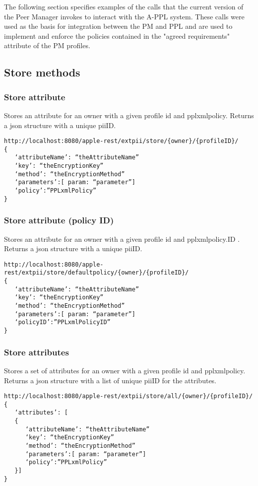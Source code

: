 The following section specifies examples of the calls that the current version of the Peer Manager invokes to interact with the A-PPL system. These calls were used as the basis for integration between the PM and PPL and are used to implement and enforce the policies contained in the "agreed requirements" attribute of the PM profiles.


\subsection{Store methods}
\subsubsection{Store attribute}
Stores an attribute for an owner with a given profile id and pplxmlpolicy. Returns a json structure with a unique piiID.
\begin{verbatim}
http://localhost:8080/apple-rest/extpii/store/{owner}/{profileID}/
{
   ‘attributeName’: “theAttributeName”
   ‘key’: “theEncryptionKey”
   ‘method’: “theEncryptionMethod”
   ‘parameters’:[ param: “parameter”]
   ‘policy’:”PPLxmlPolicy”
}
\end{verbatim}

\subsubsection{Store attribute (policy ID)}
Stores an attribute for an owner with a given profile id and pplxmlpolicy.ID . Returns a json structure with a unique piiID.
\begin{verbatim}
http://localhost:8080/apple-rest/extpii/store/defaultpolicy/{owner}/{profileID}/
{ 
   ‘attributeName’: “theAttributeName”
   ‘key’: “theEncryptionKey”
   ‘method’: “theEncryptionMethod”
   ‘parameters’:[ param: “parameter”]
   ‘policyID’:”PPLxmlPolicyID”
}
\end{verbatim}

\subsubsection{Store attributes}
Stores a set of attributes for an owner with a given profile id and pplxmlpolicy. Returns a json structure with a list of unique piiID  for the attributes.
\begin{verbatim}
http://localhost:8080/apple-rest/extpii/store/all/{owner}/{profileID}/
{
   ‘attributes’: [  
   { 
      ‘attributeName’: “theAttributeName”
      ‘key’: “theEncryptionKey”
      ‘method’: “theEncryptionMethod”
      ‘parameters’:[ param: “parameter”]
      ‘policy’:”PPLxmlPolicy”
   }]
}
\end{verbatim}

